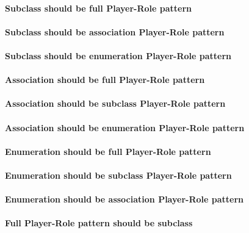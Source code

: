 \paragraph{Subclass should be full Player-Role pattern}


\paragraph{Subclass should be association Player-Role pattern}


\paragraph{Subclass should be enumeration Player-Role pattern}


\paragraph{Association should be full Player-Role pattern}


\paragraph{Association should be subclass Player-Role pattern}


\paragraph{Association should be enumeration Player-Role pattern}


\paragraph{Enumeration should be full Player-Role pattern}


\paragraph{Enumeration should be subclass Player-Role pattern}


\paragraph{Enumeration should be association Player-Role pattern}


\paragraph{Full Player-Role pattern should be subclass}


